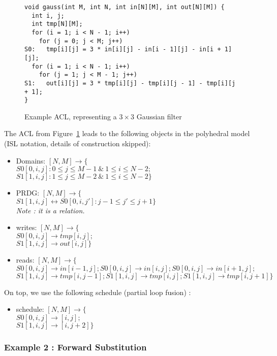 \documentclass{article}
\begin{document}
\begin{figure}[ht!]
\begin{lstlisting}
void gauss(int M, int N, int in[N][M], int out[N][M]) {
  int i, j;
  int tmp[N][M];
  for (i = 1; i < N - 1; i++)
    for (j = 0; j < M; j++)
S0:   tmp[i][j] = 3 * in[i][j] - in[i - 1][j] - in[i + 1][j];
  for (i = 1; i < N - 1; i++)
    for (j = 1; j < M - 1; j++)
S1:   out[i][j] = 3 * tmp[i][j] - tmp[i][j - 1] - tmp[i][j + 1];
}
\end{lstlisting}
\caption{
Example ACL, representing a $3 \times 3$ Gaussian filter
\label{fig:example_acl1}}
\end{figure}
The ACL from Figure~\ref{fig:example_acl1} leads to the following objects in the
polyhedral model (ISL notation, details of construction skipped):
\begin{itemize}
  \item Domains: $[N, M] \rightarrow \{ $\\ 
	  $S0[0,i,j] : 0 \le j \le M-1 ~\&~ 1 \le i \le N-2;$\\
	  $S1[1,i,j] : 1 \le j \le M-2 ~\&~ 1 \le i \le N-2 \}$
  \item PRDG: $[N, M] \rightarrow \{$\\
	  $S1[1,i,j] \leftrightarrow S0[0,i,j'] : j-1 \le j' \le j+1 \}$\\
	  \emph{Note : it is a relation.}
  \item writes: $[N, M] \rightarrow \{$\\
	  $S0[0,i,j] \rightarrow tmp[i, j];$\\
	  $S1[1,i,j] \rightarrow out[i, j] \}$
  \item reads: $[N, M] \rightarrow \{$\\
	  $S0[0,i,j] \rightarrow in[i-1, j]; S0[0,i, j] \rightarrow in[i, j]; S0[0,i,
	  j] \rightarrow in[i+1, j];$\\
	  $S1[1,i,j] \rightarrow tmp[i, j-1]; S1[1,i, j] \rightarrow tmp[i, j]; S1[1,i,
	  j] \rightarrow tmp[i, j+1] \}$
\end{itemize}
On top, we use the following schedule (partial loop fusion) :
\begin{itemize}
  \item schedule: $[N, M] \rightarrow \{$\\
	  $S0[0,i,j] \rightarrow [i, j];$\\
	  $S1[1,i,j] \rightarrow [i, j+2] \}$
\end{itemize}

\subsubsection*{Example 2 : Forward Substitution} 
\end{document}
